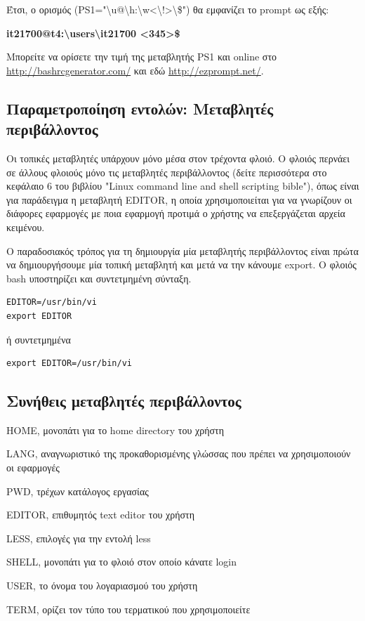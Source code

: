 Έτσι, ο ορισμός (PS1="{\textbackslash}u@{\textbackslash}h:{\textbackslash}w<{\textbackslash}!>{\textbackslash}\$") θα εμφανίζει το prompt ως
εξής: \\

\begin{center}
	\textbf{it21700@t4:{\textbackslash}users{\textbackslash}it21700 <345>\$ }                                                                
\end{center}

Μπορείτε να ορίσετε την τιμή της μεταβλητής PS1 και online στο \href{http://bashrcgenerator.com/}{http://bashrcgenerator.com/} και εδώ \href{http://ezprompt.net/}{http://ezprompt.net/}.

\subsection{Παραμετροποίηση εντολών: Μεταβλητές περιβάλλοντος}

Οι τοπικές μεταβλητές υπάρχουν μόνο μέσα στον τρέχοντα φλοιό. Ο φλοιός περνάει σε άλλους φλοιούς μόνο τις μεταβλητές περιβάλλοντος (δείτε περισσότερα στο κεφάλαιο 6 του βιβλίου "Linux command line and shell scripting bible"\cite{blum2008linux}), όπως
είναι για παράδειγμα η μεταβλητή EDITOR, η οποία χρησιμοποιείται για να γνωρίζουν οι διάφορες εφαρμογές με ποια εφαρμογή προτιμά ο χρήστης
να επεξεργάζεται αρχεία κειμένου. 

Ο παραδοσιακός τρόπος για τη δημιουργία μία μεταβλητής περιβάλλοντος είναι πρώτα να δημιουργήσουμε μία τοπική μεταβλητή και μετά να την κάνουμε export. Ο φλοιός bash υποστηρίζει και συντετμημένη σύνταξη. \\

\begin{lstlisting}
EDITOR=/usr/bin/vi 
export EDITOR 
\end{lstlisting}
ή συντετμημένα \\	
\begin{lstlisting}
export EDITOR=/usr/bin/vi 
\end{lstlisting}

\subsection{Συνήθεις μεταβλητές περιβάλλοντος}

\begin{packed_item}
	\item  HOME, μονοπάτι για το home directory του χρήστη
	\item  LANG, αναγνωριστικό    της    προκαθορισμένης  γλώσσας που πρέπει να χρησιμοποιούν οι εφαρμογές
	\item  PWD, τρέχων κατάλογος εργασίας
	\item  EDITOR, επιθυμητός text editor του χρήστη
	\item  LESS, επιλογές για την εντολή less
	\item  SHELL, μονοπάτι για το φλοιό στον οποίο κάνατε login
	\item  USER, το όνομα του λογαριασμού του χρήστη
	\item  TERM, ορίζει τον τύπο του τερματικού που χρησιμοποιείτε 
\end{packed_item}

